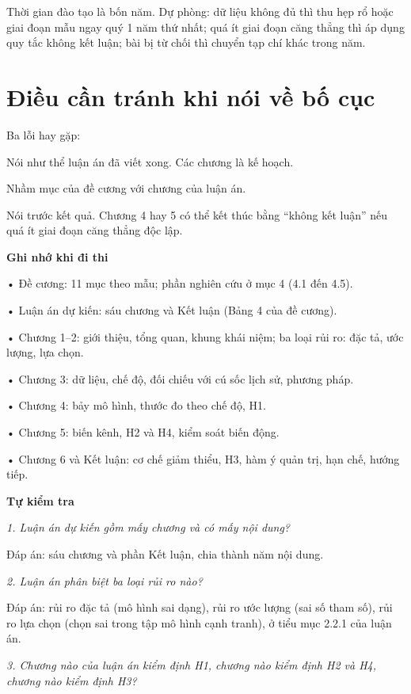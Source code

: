 Thời gian đào tạo là bốn năm. Dự phòng: dữ liệu không đủ thì thu hẹp rổ hoặc giai đoạn mẫu ngay quý 1 năm thứ nhất; quá ít giai đoạn căng thẳng thì áp dụng quy tắc không kết luận; bài bị từ chối thì chuyển tạp chí khác trong năm.

\section{Điều cần tránh khi nói về bố cục}

Ba lỗi hay gặp:

Nói như thể luận án đã viết xong. Các chương là kế hoạch.

Nhầm mục của đề cương với chương của luận án.

Nói trước kết quả. Chương 4 hay 5 có thể kết thúc bằng “không kết luận” nếu quá ít giai đoạn căng thẳng độc lập.

\begin{tcolorbox}[breakable]
\textbf{Ghi nhớ khi đi thi}

• Đề cương: 11 mục theo mẫu; phần nghiên cứu ở mục 4 (4.1 đến 4.5).

• Luận án dự kiến: sáu chương và Kết luận (Bảng 4 của đề cương).

• Chương 1--2: giới thiệu, tổng quan, khung khái niệm; ba loại rủi ro: đặc tả, ước lượng, lựa chọn.

• Chương 3: dữ liệu, chế độ, đối chiếu với cú sốc lịch sử, phương pháp.

• Chương 4: bảy mô hình, thước đo theo chế độ, H1.

• Chương 5: biến kênh, H2 và H4, kiểm soát biến động.

• Chương 6 và Kết luận: cơ chế giảm thiểu, H3, hàm ý quản trị, hạn chế, hướng tiếp.
\end{tcolorbox}

\textbf{Tự kiểm tra}

{\itshape 1. Luận án dự kiến gồm mấy chương và có mấy nội dung?\par}

Đáp án: sáu chương và phần Kết luận, chia thành năm nội dung.

{\itshape 2. Luận án phân biệt ba loại rủi ro nào?\par}

Đáp án: rủi ro đặc tả (mô hình sai dạng), rủi ro ước lượng (sai số tham số), rủi ro lựa chọn (chọn sai trong tập mô hình cạnh tranh), ở tiểu mục 2.2.1 của luận án.

{\itshape 3. Chương nào của luận án kiểm định H1, chương nào kiểm định H2 và H4, chương nào kiểm định H3?\par}


